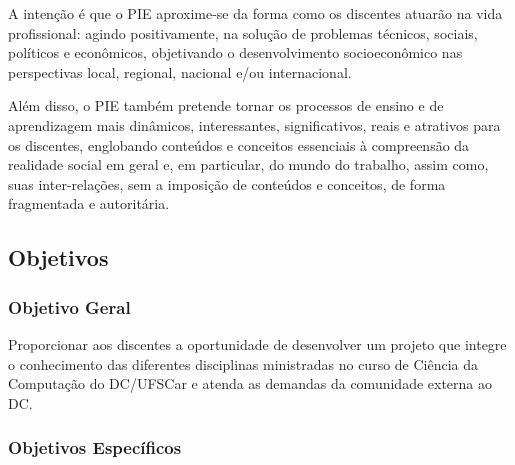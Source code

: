 A intenção é que o PIE aproxime-se da forma como os discentes atuarão na vida profissional: agindo positivamente, na solução de problemas técnicos, sociais, políticos e econômicos, objetivando o desenvolvimento socioeconômico nas perspectivas local, regional, nacional e/ou internacional.

Além disso, o PIE também pretende tornar os processos de ensino e de
aprendizagem mais dinâmicos, interessantes, significativos, reais e atrativos para os discentes, englobando conteúdos e conceitos essenciais à compreensão da realidade social em geral e, em particular, do mundo do trabalho, assim como, suas inter-relações, sem a imposição de conteúdos e conceitos, de forma fragmentada e autoritária.

\subsection{Objetivos}

\subsubsection{Objetivo Geral}

Proporcionar aos discentes a oportunidade de desenvolver um projeto que integre o conhecimento das diferentes disciplinas ministradas no curso de Ciência da Computação do DC/UFSCar e atenda as demandas da comunidade externa ao DC.

\subsubsection{Objetivos Específicos}

